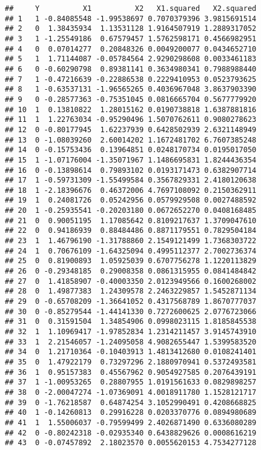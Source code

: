 \documentclass[
]{article}
\begin{document}
\begin{verbatim}
##     Y          X1          X2   X1.squared   X2.squared
## 1   1 -0.84085548 -1.99538697 0.7070379396 3.9815691514
## 2   0  1.38435934  1.13531128 1.9164507919 1.2889317052
## 3   1 -1.25549186  0.67579457 1.5762598171 0.4566982951
## 4   0  0.07014277  0.20848326 0.0049200077 0.0434652710
## 5   1  1.71144087 -0.05784564 2.9290298608 0.0033461183
## 6   0 -0.60290798  0.89381141 0.3634980341 0.7988988440
## 7   1 -0.47216639 -0.22886538 0.2229410953 0.0523793625
## 8   1 -0.63537131 -1.96565265 0.4036967048 3.8637903390
## 9   0 -0.28577363 -0.75351045 0.0816665704 0.5677779920
## 10  1  0.13810822  1.28015162 0.0190738818 1.6387881816
## 11  1  1.22763034 -0.95290496 1.5070762611 0.9080278623
## 12  0 -0.80177945  1.62237939 0.6428502939 2.6321148949
## 13  0 -1.08039260  2.60014202 1.1672481702 6.7607385248
## 14  0 -0.15753436  0.13964851 0.0248170734 0.0195017050
## 15  1 -1.07176004 -1.35071967 1.1486695831 1.8244436354
## 16  0 -0.13898614  0.79893102 0.0193171473 0.6382907714
## 17  1 -0.59731309 -1.55499584 0.3567829331 2.4180120638
## 18  1 -2.18396676  0.46372006 4.7697108092 0.2150362911
## 19  1  0.24081726  0.05242956 0.0579929508 0.0027488592
## 20  1 -0.25935541 -0.20203180 0.0672652270 0.0408168485
## 21  0  0.90051195  1.17085642 0.8109217637 1.3709047610
## 22  0  0.94186939  0.88484486 0.8871179551 0.7829504184
## 23  1  1.46796190 -1.31788860 2.1549121499 1.7368303722
## 24  1  0.70676109 -1.64325094 0.4995112377 2.7002736374
## 25  0  0.81900893  1.05925039 0.6707756278 1.1220113829
## 26  0 -0.29348185  0.29008358 0.0861315955 0.0841484842
## 27  0  1.41858907 -0.40003350 2.0123949566 0.1600268002
## 28  0  1.49877383  1.24309578 2.2463229857 1.5452871134
## 29  0 -0.65708209 -1.36641052 0.4317568789 1.8670777037
## 30  0 -0.85279544 -1.44141330 0.7272600625 2.0776723066
## 31  0  0.31591504  1.34854906 0.0998023115 1.8185845538
## 32  1  1.10969417 -1.97852834 1.2314211457 3.9145743910
## 33  1  2.21546057 -1.24095058 4.9082655447 1.5399583520
## 34  0  1.21710364 -0.10403913 1.4813412680 0.0108241401
## 35  0  1.47922179  0.73297296 2.1880970941 0.5372493581
## 36  1  0.95157383  0.45567962 0.9054927585 0.2076439191
## 37  1 -1.00953265  0.28807955 1.0191561633 0.0829898257
## 38  0 -2.00047274 -1.07369091 4.0018911780 1.1528121717
## 39  0 -1.76218587  0.64874254 3.1052990491 0.4208668825
## 40  1 -0.14260813  0.29916228 0.0203370776 0.0894980689
## 41  1  1.55006037 -0.79599499 2.4026871490 0.6336080289
## 42  0 -0.80242318 -0.02935340 0.6438829626 0.0008616219
## 43  0 -0.07457892  2.18023570 0.0055620153 4.7534277128

\end{verbatim}
\end{document}
